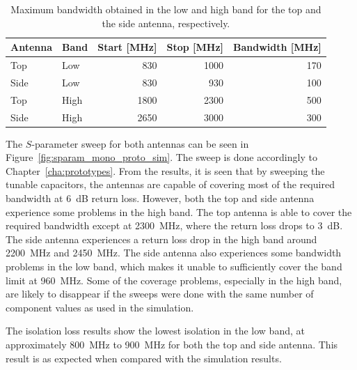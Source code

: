     \begin{table}
      \centering
      \begin{tabular}{|l|l|r|r|r|}
        \hline
        Antenna & Band & Start [MHz] & Stop [MHz] & Bandwidth [MHz] \\
        \hline
        Top     & Low  & 830        & 1000       & 170 \\
        Side    & Low  & 830         & 930        & 100 \\
        \hline
        Top     & High & 1800        & 2300       & 500 \\
        Side    & High & 2650        & 3000       & 300 \\
        \hline
      \end{tabular}
      \caption{Maximum bandwidth obtained in the low and high band for the top and the side antenna, respectively.}
      \label{tab:bw_sol1_proto}
    \end{table}

The $S$-parameter sweep for both antennas can be seen in Figure~\ref{fig:sparam_mono_proto_sim}. The sweep is done accordingly to Chapter~\ref{cha:prototypes}. From the results, it is seen that by sweeping the tunable capacitors, the antennas are capable of covering most of the required bandwidth at \SI{6}{dB} return loss. However, both the top and side antenna experience some problems in the high band. The top antenna is able to cover the required bandwidth except at \SI{2300}{MHz}, where the return loss drops to \SI{3}{dB}. The side antenna experiences a return loss drop in the high band around \SI{2200}{MHz} and \SI{2450}{MHz}. The side antenna also experiences some bandwidth problems in the low band, which makes it unable to sufficiently cover the band limit at \SI{960}{MHz}. Some of the coverage problems, especially in the high band, are likely to disappear if the sweeps were done with the same number of component values as used in the simulation.   

The isolation loss results show the lowest isolation in the low band, at approximately \SI{800}{MHz} to \SI{900}{MHz} for both the top and side antenna. This result is as expected when compared with the simulation results.

